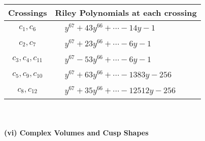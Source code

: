 \documentclass[1p]{elsarticle_modified}
\theoremstyle{definition}
\begin{document}
\begin{tabular}{m{50pt}|m{274pt}}
Crossings & \hspace{64pt}Riley Polynomials at each crossing \\
\hline $$\begin{aligned}c_{1},c_{6}\end{aligned}$$&$\begin{aligned}
&y^{67}+43 y^{66}+\cdots-14 y-1
\end{aligned}$\\
\hline $$\begin{aligned}c_{2},c_{7}\end{aligned}$$&$\begin{aligned}
&y^{67}+23 y^{66}+\cdots-6 y-1
\end{aligned}$\\
\hline $$\begin{aligned}c_{3},c_{4},c_{11}\end{aligned}$$&$\begin{aligned}
&y^{67}-53 y^{66}+\cdots-6 y-1
\end{aligned}$\\
\hline $$\begin{aligned}c_{5},c_{9},c_{10}\end{aligned}$$&$\begin{aligned}
&y^{67}+63 y^{66}+\cdots-1383 y-256
\end{aligned}$\\
\hline $$\begin{aligned}c_{8},c_{12}\end{aligned}$$&$\begin{aligned}
&y^{67}+35 y^{66}+\cdots-12512 y-256
\end{aligned}$\\
\hline
\end{tabular}\\~\\
\newpage\flushleft \textbf{(vi) Complex Volumes and Cusp Shapes}
\end{document}
